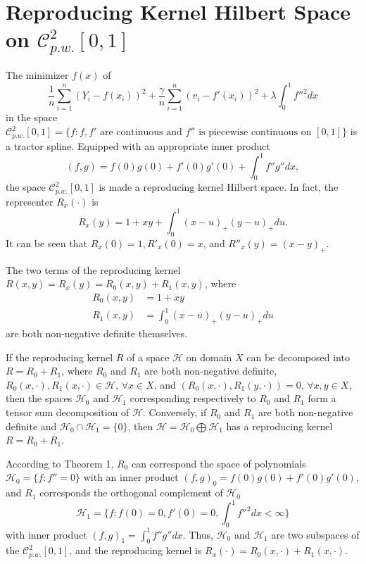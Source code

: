 \section{Reproducing Kernel Hilbert Space on $\mathcal{C}_{p.w.}^{2}[0,1]$}
The minimizer $f(x)$ of
\begin{equation}\label{maineq}
\frac{1}{n}\sum_{i=1}^{n}(Y_i-f(x_i))^2+\frac{\gamma}{n}\sum_{i=1}^{n}(v_i-f'(x_i))^2+\lambda \int_{0}^{1}f''^2dx
\end{equation}
in the space $\mathcal{C}_{p.w.}^{2}[0,1]=\{f:f,f' \mbox{ are continuous and } f'' \mbox{ is piecewise continuous on } [0,1] \}$ is a tractor spline. Equipped with an appropriate inner product
\begin{equation}
(f,g)=f(0) g(0)+f'(0) g'(0)+\int_{0}^{1}f''g''dx,
\end{equation}
the space $\mathcal{C}_{p.w.}^{2}[0,1]$ is made a reproducing kernel Hilbert space. In fact, the representer $R_x(\cdot)$ is 
\begin{equation}\label{kerneleq}
R_x(y)=1+xy+\int_{0}^{1} (x-u)_+(y-u)_+du.
\end{equation}
It can be seen that $R_x(0)=1, R'_x(0)=x$, and $R''_x(y)=(x-y)_+$.

The two terms of the reproducing kernel $R(x,y)=R_x(y)=R_0(x,y)+R_1(x,y)$, where
\begin{align}
R_0(x,y)&=1+xy \\
R_1(x,y)&=\int_{0}^{1} (x-u)_+(y-u)_+du
\end{align}
are both non-negative definite themselves.

\begin{theorem}
If the reproducing kernel $R$ of a space $\mathcal{H}$ on domain $X$ can be decomposed into $R = R_0+R_1$, where $R_0$ and $R_1$ are both non-negative definite, $R_0(x,\cdot), R_1(x,\cdot) \in \mathcal{H}$, $\forall x \in X$, and $(R_0(x, ·),R_1(y, ·)) = 0$, $\forall x, y \in X$, then the spaces $\mathcal{H}_0$ and $\mathcal{H}_1$ corresponding respectively to $R_0$ and $R_1$ form a tensor sum decomposition of $\mathcal{H}$. Conversely, if $R_0$ and $R_1$ are both non-negative definite and $\mathcal{H}_0 \cap \mathcal{H}_1 = \{ 0 \}$, then $\mathcal{H} = \mathcal{H}_0 \bigoplus \mathcal{H}_1$ has a reproducing kernel $R = R_0 + R_1$.
\end{theorem}

According to Theorem 1, $R_0$ can correspond the space of polynomials $\mathcal{H}_0=\{f:f''=0\}$ with an inner product $(f,g)_0= f(0)g(0)+f'(0)g'(0)$, and $R_1$ corresponds the orthogonal complement of $\mathcal{H}_0$
\begin{equation*}
\mathcal{H}_1=\{f:f(0)=0, f'(0)=0, \int_{0}^{1}f''^2dx<\infty\}
\end{equation*}
with inner product $(f,g)_1=\int_{0}^{1}f''g''dx$. Thus, $\mathcal{H}_0$ and $\mathcal{H}_1$ are two subspaces of the $\mathcal{C}_{p.w.}^{2}[0,1]$, and the reproducing kernel is $R_x(\cdot) = R_0(x,\cdot)+R_1(x,\cdot)$.

